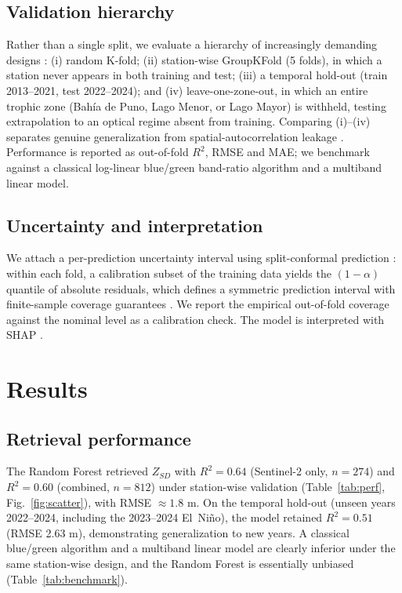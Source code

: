 \documentclass[pdflatex,sn-basic]{sn-jnl}
\begin{document}
\subsection{Validation hierarchy}
Rather than a single split, we evaluate a hierarchy of increasingly demanding
designs \citep{Roberts2017}: (i) random K-fold; (ii) station-wise GroupKFold (5
folds), in which a station never appears in both training and test; (iii) a
temporal hold-out (train 2013--2021, test 2022--2024); and (iv) leave-one-zone-out,
in which an entire trophic zone (Bah\'ia de Puno, Lago Menor, or Lago Mayor) is
withheld, testing extrapolation to an optical regime absent from training.
Comparing (i)--(iv) separates genuine generalization from spatial-autocorrelation
leakage \citep{Ploton2020,Meyer2019}. Performance is reported as out-of-fold $R^2$,
RMSE and MAE; we benchmark against a classical log-linear blue/green band-ratio
algorithm and a multiband linear model.

\subsection{Uncertainty and interpretation}
We attach a per-prediction uncertainty interval using split-conformal prediction
\citep{Angelopoulos2023}: within each fold, a calibration subset of the training
data yields the $(1-\alpha)$ quantile of absolute residuals, which defines a
symmetric prediction interval with finite-sample coverage guarantees
\citep{Romano2019}. We report the empirical out-of-fold coverage against the nominal
level as a calibration check. The model is interpreted with SHAP
\citep{Lundberg2017,Lundberg2020}.

\section{Results}\label{sec:results}
\subsection{Retrieval performance}
The Random Forest retrieved $Z_{SD}$ with $R^2=0.64$ (Sentinel-2 only, $n=274$) and
$R^2=0.60$ (combined, $n=812$) under station-wise validation
(Table~\ref{tab:perf}, Fig.~\ref{fig:scatter}), with RMSE $\approx1.8$ m. On the
temporal hold-out (unseen years 2022--2024, including the 2023--2024 El~Ni\~no), the
model retained $R^2=0.51$ (RMSE 2.63 m), demonstrating generalization to new years.
A classical blue/green algorithm and a multiband linear model are clearly inferior
under the same station-wise design, and the Random Forest is essentially unbiased
(Table~\ref{tab:benchmark}).
\end{document}
